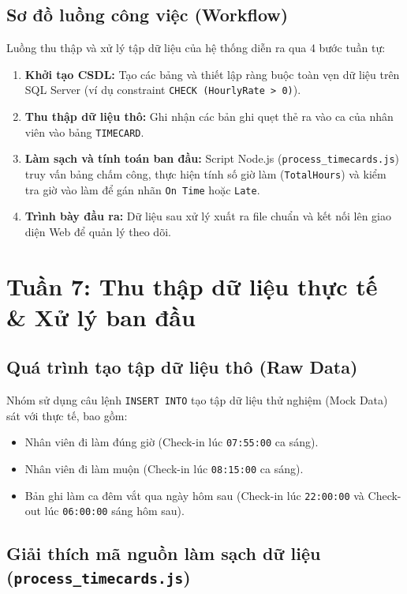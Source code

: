 \documentclass[12pt,a4paper]{article}
\begin{document}
\subsection{Sơ đồ luồng công việc (Workflow)}
Luồng thu thập và xử lý tập dữ liệu của hệ thống diễn ra qua 4 bước tuần tự:
\begin{enumerate}
    \item \textbf{Khởi tạo CSDL:} Tạo các bảng và thiết lập ràng buộc toàn vẹn dữ liệu trên SQL Server (ví dụ constraint \texttt{CHECK (HourlyRate > 0)}).
    \item \textbf{Thu thập dữ liệu thô:} Ghi nhận các bản ghi quẹt thẻ ra vào ca của nhân viên vào bảng \texttt{TIMECARD}.
    \item \textbf{Làm sạch và tính toán ban đầu:} Script Node.js (\texttt{process\_timecards.js}) truy vấn bảng chấm công, thực hiện tính số giờ làm (\texttt{TotalHours}) và kiểm tra giờ vào làm để gán nhãn \texttt{On Time} hoặc \texttt{Late}.
    \item \textbf{Trình bày đầu ra:} Dữ liệu sau xử lý xuất ra file chuẩn và kết nối lên giao diện Web để quản lý theo dõi.
\end{enumerate}

\section{Tuần 7: Thu thập dữ liệu thực tế \& Xử lý ban đầu}

\subsection{Quá trình tạo tập dữ liệu thô (Raw Data)}
Nhóm sử dụng câu lệnh \texttt{INSERT INTO} tạo tập dữ liệu thử nghiệm (Mock Data) sát với thực tế, bao gồm:
\begin{itemize}
    \item Nhân viên đi làm đúng giờ (Check-in lúc \texttt{07:55:00} ca sáng).
    \item Nhân viên đi làm muộn (Check-in lúc \texttt{08:15:00} ca sáng).
    \item Bản ghi làm ca đêm vắt qua ngày hôm sau (Check-in lúc \texttt{22:00:00} và Check-out lúc \texttt{06:00:00} sáng hôm sau).
\end{itemize}

\subsection{Giải thích mã nguồn làm sạch dữ liệu (\texttt{process\_timecards.js})}
\end{document}
